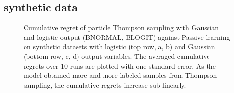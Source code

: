 \subsection{synthetic data}
\begin{figure}[t]
	\centering
	\caption{\label{fig:synthetic} Cumulative regret of particle Thompson sampling with Gaussian and logistic output ({\sc BNORMAL, BLOGIT}) against Passive learning 
	on synthetic datasets with logistic	(top row, a, b) and Gaussian (bottom row, c, d) output variables.
	The averaged cumulative regrets over 10 runs are plotted with one standard error. 
	As the model obtained more and more labeled samples from Thompson sampling, 
	the cumulative regrets increase sub-linearly.}
\end{figure}

